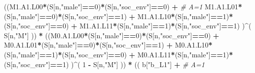 \documentclass[
]{book}
\newenvironment{Shaded}{\begin{snugshade}}{\end{snugshade}}
\newcommand{\CommentTok}[1]{\textcolor[rgb]{0.56,0.35,0.01}{\textit{#1}}}
\newcommand{\DecValTok}[1]{\textcolor[rgb]{0.00,0.00,0.81}{#1}}
\newcommand{\NormalTok}[1]{#1}
\newcommand{\SpecialCharTok}[1]{\textcolor[rgb]{0.81,0.36,0.00}{\textbf{#1}}}
\newcommand{\StringTok}[1]{\textcolor[rgb]{0.31,0.60,0.02}{#1}}
\begin{document}
\begin{Shaded}
\begin{Highlighting}[]
\NormalTok{          ((M1.A1.L00}\SpecialCharTok{*}\NormalTok{(S[n,}\StringTok{"male"}\NormalTok{]}\SpecialCharTok{==}\DecValTok{0}\NormalTok{)}\SpecialCharTok{*}\NormalTok{(S[n,}\StringTok{"soc\_env"}\NormalTok{]}\SpecialCharTok{==}\DecValTok{0}\NormalTok{) }\SpecialCharTok{+}                \CommentTok{\# A\textquotesingle{}=1}
\NormalTok{              M1.A1.L01}\SpecialCharTok{*}\NormalTok{(S[n,}\StringTok{"male"}\NormalTok{]}\SpecialCharTok{==}\DecValTok{0}\NormalTok{)}\SpecialCharTok{*}\NormalTok{(S[n,}\StringTok{"soc\_env"}\NormalTok{]}\SpecialCharTok{==}\DecValTok{1}\NormalTok{) }\SpecialCharTok{+}
\NormalTok{              M1.A1.L10}\SpecialCharTok{*}\NormalTok{(S[n,}\StringTok{"male"}\NormalTok{]}\SpecialCharTok{==}\DecValTok{1}\NormalTok{)}\SpecialCharTok{*}\NormalTok{(S[n,}\StringTok{"soc\_env"}\NormalTok{]}\SpecialCharTok{==}\DecValTok{0}\NormalTok{) }\SpecialCharTok{+} 
\NormalTok{              M1.A1.L11}\SpecialCharTok{*}\NormalTok{(S[n,}\StringTok{"male"}\NormalTok{]}\SpecialCharTok{==}\DecValTok{1}\NormalTok{)}\SpecialCharTok{*}\NormalTok{(S[n,}\StringTok{"soc\_env"}\NormalTok{]}\SpecialCharTok{==}\DecValTok{1}\NormalTok{) )}\SpecialCharTok{\^{}}\NormalTok{( S[n,}\StringTok{"M"}\NormalTok{] )) }\SpecialCharTok{*}
\NormalTok{      ((M0.A1.L00}\SpecialCharTok{*}\NormalTok{(S[n,}\StringTok{"male"}\NormalTok{]}\SpecialCharTok{==}\DecValTok{0}\NormalTok{)}\SpecialCharTok{*}\NormalTok{(S[n,}\StringTok{"soc\_env"}\NormalTok{]}\SpecialCharTok{==}\DecValTok{0}\NormalTok{) }\SpecialCharTok{+}                
\NormalTok{          M0.A1.L01}\SpecialCharTok{*}\NormalTok{(S[n,}\StringTok{"male"}\NormalTok{]}\SpecialCharTok{==}\DecValTok{0}\NormalTok{)}\SpecialCharTok{*}\NormalTok{(S[n,}\StringTok{"soc\_env"}\NormalTok{]}\SpecialCharTok{==}\DecValTok{1}\NormalTok{) }\SpecialCharTok{+}
\NormalTok{          M0.A1.L10}\SpecialCharTok{*}\NormalTok{(S[n,}\StringTok{"male"}\NormalTok{]}\SpecialCharTok{==}\DecValTok{1}\NormalTok{)}\SpecialCharTok{*}\NormalTok{(S[n,}\StringTok{"soc\_env"}\NormalTok{]}\SpecialCharTok{==}\DecValTok{0}\NormalTok{) }\SpecialCharTok{+} 
\NormalTok{          M0.A1.L11}\SpecialCharTok{*}\NormalTok{(S[n,}\StringTok{"male"}\NormalTok{]}\SpecialCharTok{==}\DecValTok{1}\NormalTok{)}\SpecialCharTok{*}\NormalTok{(S[n,}\StringTok{"soc\_env"}\NormalTok{]}\SpecialCharTok{==}\DecValTok{1}\NormalTok{) )}\SpecialCharTok{\^{}}\NormalTok{( }\DecValTok{1} \SpecialCharTok{{-}}\NormalTok{ S[n,}\StringTok{"M"}\NormalTok{] )) }\SpecialCharTok{*}
\NormalTok{      (( b[}\StringTok{"b\_L1"}\NormalTok{] }\SpecialCharTok{+}                                                            \CommentTok{\# A=1}

\end{Highlighting}
\end{Shaded}
\end{document}
